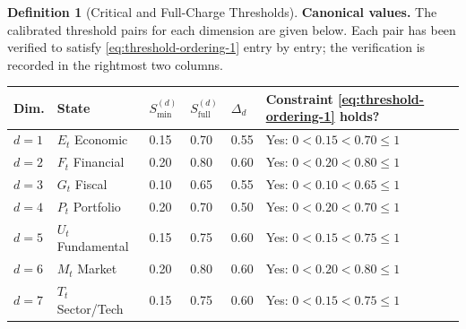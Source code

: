 \documentclass[12pt,openany]{book}
\newcommand{\calE}{\mathcal{E}}
\newcommand{\calF}{\mathcal{F}}
\newcommand{\calG}{\mathcal{G}}
\newcommand{\calP}{\mathcal{P}}
\newcommand{\calU}{\mathcal{U}}
\newcommand{\calM}{\mathcal{M}}
\newcommand{\calT}{\mathcal{T}}
\numberwithin{equation}{chapter}
\theoremstyle{plain}
\theoremstyle{definition}
\newtheorem{definition}[theorem]{Definition}
\theoremstyle{remark}
\def\mathcal#1{#1}%
\begin{document}
\begin{definition}[Critical and Full-Charge Thresholds]
\medskip
\noindent\textbf{Canonical values.}
The calibrated threshold pairs for each dimension are given
below. Each pair has been verified to satisfy
\eqref{eq:threshold-ordering-1} entry by entry; the
verification is recorded in the rightmost two columns.

\medskip
\begin{center}
\begin{tabularx}{\textwidth}{@{} l l X X X X @{}}
\toprule
\textbf{Dim.} & \textbf{State}
  & $\mathcal{S}_{\min}^{(d)}$
  & $\mathcal{S}_{\mathrm{full}}^{(d)}$
  & $\Delta_d$
  & \textbf{Constraint \eqref{eq:threshold-ordering-1} holds?} \\
\midrule
$d=1$ & $\calE_t$ Economic    & 0.15 & 0.70 & 0.55 & Yes: $0<0.15<0.70\leq 1$ \\
$d=2$ & $\calF_t$ Financial   & 0.20 & 0.80 & 0.60 & Yes: $0<0.20<0.80\leq 1$ \\
$d=3$ & $\calG_t$ Fiscal      & 0.10 & 0.65 & 0.55 & Yes: $0<0.10<0.65\leq 1$ \\
$d=4$ & $\calP_t$ Portfolio   & 0.20 & 0.70 & 0.50 & Yes: $0<0.20<0.70\leq 1$ \\
$d=5$ & $\calU_t$ Fundamental & 0.15 & 0.75 & 0.60 & Yes: $0<0.15<0.75\leq 1$ \\
$d=6$ & $\calM_t$ Market      & 0.20 & 0.80 & 0.60 & Yes: $0<0.20<0.80\leq 1$ \\
$d=7$ & $\calT_t$ Sector/Tech & 0.15 & 0.75 & 0.60 & Yes: $0<0.15<0.75\leq 1$ \\
\bottomrule
\end{tabularx}
\end{center}


\end{definition}
\end{document}
